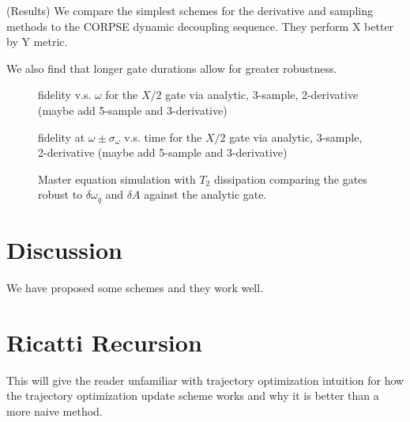 \documentclass[
  amsfonts,
  amsmath,
  tbtags,
  amssymb,
  aps,
  nobibnotes,
  prl,
  twocolumn,
]{revtex4-2}
\begin{document}
(Results) We compare the simplest schemes
for the derivative and sampling methods to
the CORPSE dynamic decoupling sequence.
They perform X better by Y metric.

We also find that longer gate durations allow for
greater robustness.

\begin{figure}
  \caption{fidelity v.s. $\omega$ for the $X/2$ gate via
    analytic, 3-sample, 2-derivative (maybe add 5-sample and 3-derivative)}
\end{figure}

\begin{figure}
  \caption{fidelity at $\omega \pm \sigma_{\omega}$ v.s. time for the
    $X/2$ gate via analytic, 3-sample, 2-derivative
    (maybe add 5-sample and 3-derivative)}
\end{figure}

\begin{figure}
  \caption{Master equation simulation with $T_{2}$ dissipation
    comparing the gates robust to $\delta \omega_{q}$ and $\delta A$ against
    the analytic gate.}
\end{figure}



\section{Discussion}
We have proposed some schemes and they work well.


\appendix
\section{Ricatti Recursion}
This will give the reader unfamiliar with trajectory
optimization intuition for how the trajectory optimization
update scheme works and why it is better than
a more naive method.
\end{document}
